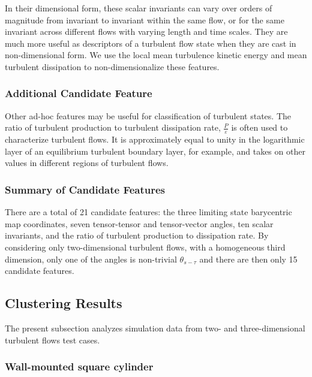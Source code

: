 In their dimensional form, these scalar invariants can vary over orders of magnitude from invariant to
invariant within the same ﬂow, or for the same invariant across different ﬂows with varying length and time scales. They are much more useful as descriptors of a turbulent ﬂow state when they are cast in
non-dimensional form. We use the local mean turbulence kinetic energy and mean turbulent dissipation to
non-dimensionalize these features.

\subsubsection{Additional Candidate Feature}

Other ad-hoc features may be useful for classiﬁcation of turbulent states. The ratio of turbulent production to turbulent dissipation rate, $\frac{P}{\varepsilon}$ is often used to characterize turbulent ﬂows. It is approximately equal to unity in the logarithmic layer of an equilibrium turbulent boundary layer, for example, and takes on other values in different regions of turbulent ﬂows.

\subsubsection{Summary of Candidate Features}

There are a total of 21 candidate features: the three limiting state barycentric map coordinates, seven tensor-tensor and tensor-vector angles, ten scalar invariants, and the ratio of turbulent production to dissipation rate. By considering only two-dimensional turbulent ﬂows, with a homogeneous third dimension, only one of the angles is non-trivial $\theta_{s-\tau}$ and there are then only 15 candidate features.

\subsection{Clustering Results}

The present subsection analyzes simulation data from two- and three-dimensional turbulent ﬂows test cases.

\subsubsection{Wall-mounted square cylinder}

